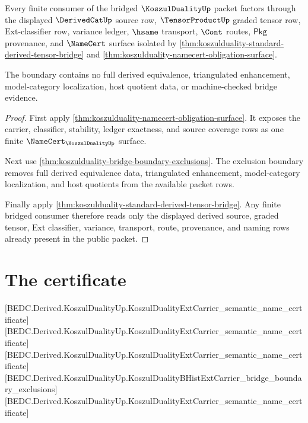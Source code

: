 \begin{theorem}
\label{thm:koszulduality-mature-ext-bridge-boundary}
Every finite consumer of the bridged $\KoszulDualityUp$ packet factors through
the displayed $\DerivedCatUp$ source row, $\TensorProductUp$ graded tensor row,
$\mathrm{Ext}$-classifier row, variance ledger, $\hsame$ transport, $\Cont$
routes, $\mathsf{Pkg}$ provenance, and $\NameCert$ surface isolated by
\autoref{thm:koszulduality-standard-derived-tensor-bridge} and
\autoref{thm:koszulduality-namecert-obligation-surface}.

The boundary contains no full derived equivalence, triangulated enhancement,
model-category localization, host quotient data, or machine-checked bridge
evidence.
\end{theorem}
\begin{proof}
First apply \autoref{thm:koszulduality-namecert-obligation-surface}. It exposes
the carrier, classifier, stability, ledger exactness, and source coverage rows
as one finite $\NameCert_{\KoszulDualityUp}$ surface.

Next use \autoref{thm:koszulduality-bridge-boundary-exclusions}. The exclusion
boundary removes full derived equivalence data, triangulated enhancement,
model-category localization, and host quotients from the available packet rows.

Finally apply \autoref{thm:koszulduality-standard-derived-tensor-bridge}. Any
finite bridged consumer therefore reads only the displayed derived source,
graded tensor, $\mathrm{Ext}$ classifier, variance, transport, route,
provenance, and naming rows already present in the public packet.
\end{proof}

\section{The certificate}
\label{sec:koszulduality-certificate}

[BEDC.Derived.KoszulDualityUp.KoszulDualityExtCarrier\_semantic\_name\_certificate]
[BEDC.Derived.KoszulDualityUp.KoszulDualityExtCarrier\_semantic\_name\_certificate]
[BEDC.Derived.KoszulDualityUp.KoszulDualityExtCarrier\_semantic\_name\_certificate]
[BEDC.Derived.KoszulDualityUp.KoszulDualityBHistExtCarrier\_bridge\_boundary\_exclusions]
[BEDC.Derived.KoszulDualityUp.KoszulDualityExtCarrier\_semantic\_name\_certificate]

